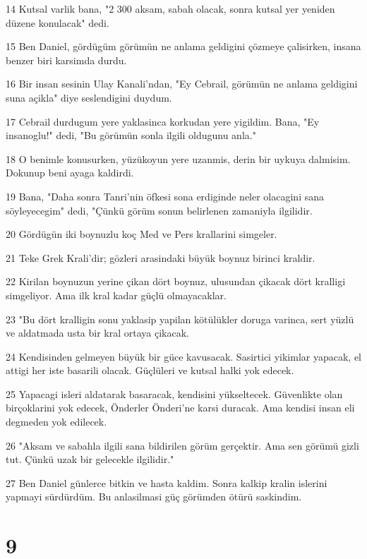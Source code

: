 \par 14 Kutsal varlik bana, "2 300 aksam, sabah olacak, sonra kutsal yer yeniden düzene konulacak" dedi.
\par 15 Ben Daniel, gördügüm görümün ne anlama geldigini çözmeye çalisirken, insana benzer biri karsimda durdu.
\par 16 Bir insan sesinin Ulay Kanali'ndan, "Ey Cebrail, görümün ne anlama geldigini suna açikla" diye seslendigini duydum.
\par 17 Cebrail durdugum yere yaklasinca korkudan yere yigildim. Bana, "Ey insanoglu!" dedi, "Bu görümün sonla ilgili oldugunu anla."
\par 18 O benimle konusurken, yüzükoyun yere uzanmis, derin bir uykuya dalmisim. Dokunup beni ayaga kaldirdi.
\par 19 Bana, "Daha sonra Tanri'nin öfkesi sona erdiginde neler olacagini sana söyleyecegim" dedi, "Çünkü görüm sonun belirlenen zamaniyla ilgilidir.
\par 20 Gördügün iki boynuzlu koç Med ve Pers krallarini simgeler.
\par 21 Teke Grek Krali'dir; gözleri arasindaki büyük boynuz birinci kraldir.
\par 22 Kirilan boynuzun yerine çikan dört boynuz, ulusundan çikacak dört kralligi simgeliyor. Ama ilk kral kadar güçlü olmayacaklar.
\par 23 "Bu dört kralligin sonu yaklasip yapilan kötülükler doruga varinca, sert yüzlü ve aldatmada usta bir kral ortaya çikacak.
\par 24 Kendisinden gelmeyen büyük bir güce kavusacak. Sasirtici yikimlar yapacak, el attigi her iste basarili olacak. Güçlüleri ve kutsal halki yok edecek.
\par 25 Yapacagi isleri aldatarak basaracak, kendisini yükseltecek. Güvenlikte olan birçoklarini yok edecek, Önderler Önderi'ne karsi duracak. Ama kendisi insan eli degmeden yok edilecek.
\par 26 "Aksam ve sabahla ilgili sana bildirilen görüm gerçektir. Ama sen görümü gizli tut. Çünkü uzak bir gelecekle ilgilidir."
\par 27 Ben Daniel günlerce bitkin ve hasta kaldim. Sonra kalkip kralin islerini yapmayi sürdürdüm. Bu anlasilmasi güç görümden ötürü saskindim.

\chapter{9}

